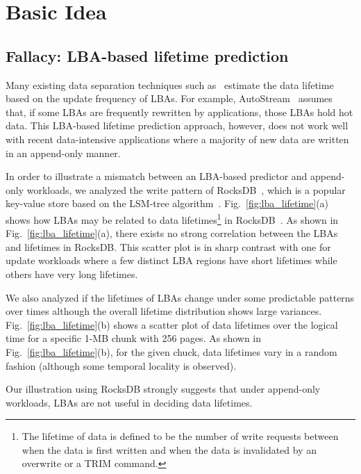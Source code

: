 \vspace{-13pt}
\section{Basic Idea}
\vspace{-5pt}
\subsection{Fallacy: LBA-based lifetime prediction}
Many existing data separation techniques such as~\cite{AutoStream, HotCold} 
estimate the data lifetime based on the update frequency of LBAs.  
For example, AutoStream~\cite{AutoStream} assumes that, if
some LBAs are frequently rewritten by applications, those LBAs hold hot data.
This LBA-based lifetime prediction 
approach, however, does not work well with recent data-intensive 
applications where a majority of
new data are written in an append-only manner.  



In order to illustrate a mismatch between an LBA-based predictor and 
append-only workloads, we analyzed the write pattern of 
RocksDB~\cite{RocksDB}, which is a
popular key-value store based on the LSM-tree algorithm~\cite{LSM}.
Fig.~\ref{fig:lba_lifetime}(a) shows how LBAs may be related 
to data lifetimes\footnote{The lifetime of data is defined to be 
the number of write requests between when the data is first written 
and when the data is invalidated by an overwrite or a TRIM command.}
in RocksDB~\cite{RocksDB}.  
As shown in Fig.~\ref{fig:lba_lifetime}(a), 
there exists no strong correlation between the LBAs and lifetimes in RocksDB.  
This scatter plot is in sharp contrast with one for update workloads 
where a few distinct LBA regions have short lifetimes while others 
have very long lifetimes.

We also analyzed 
if the lifetimes of LBAs change under some predictable patterns over times 
although the overall lifetime distribution shows large variances.
Fig.~\ref{fig:lba_lifetime}(b) shows a scatter plot of data lifetimes over the logical time 
for a specific 1-MB chunk with 256 pages. 
As shown in Fig.~\ref{fig:lba_lifetime}(b), 
for the given chuck, data lifetimes vary in a random fashion
(although some temporal locality is observed).

Our illustration using RocksDB strongly suggests that under append-only
workloads, LBAs are not useful in deciding data lifetimes.

